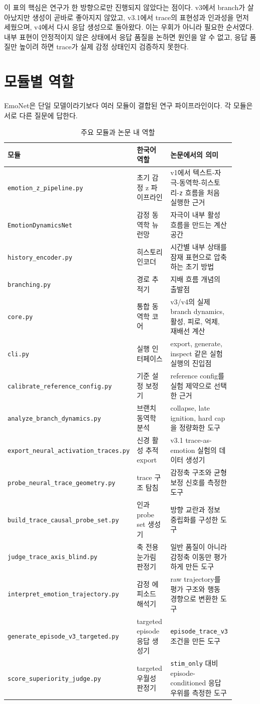 \documentclass[11pt,a4paper]{article}
\newcommand{\eng}[1]{\texttt{#1}}
\begin{document}
이 표의 핵심은 연구가 한 방향으로만 진행되지 않았다는 점이다. v3에서 branch가 살아났지만 생성이 곧바로 좋아지지 않았고, v3.1에서 trace의 표현성과 인과성을 먼저 세웠으며, v4에서 다시 응답 생성으로 돌아왔다. 이는 우회가 아니라 필요한 순서였다. 내부 표현이 안정적이지 않은 상태에서 응답 품질을 논하면 원인을 알 수 없고, 응답 품질만 높이려 하면 trace가 실제 감정 상태인지 검증하지 못한다.

\section{모듈별 역할}

EmoNet은 단일 모델이라기보다 여러 모듈이 결합된 연구 파이프라인이다. 각 모듈은 서로 다른 질문에 답한다.

\begin{longtable}{p{0.34\linewidth}p{0.25\linewidth}p{0.31\linewidth}}
\caption{주요 모듈과 논문 내 역할}\\
\toprule
모듈 & 한국어 역할 & 논문에서의 의미 \\
\midrule
\eng{emotion\_z\_pipeline.py} & 초기 감정 z 파이프라인 & v1에서 텍스트-자극-동역학-히스토리-\eng{z} 흐름을 처음 실행한 근거 \\
\eng{EmotionDynamicsNet} & 감정 동역학 뉴런망 & 자극이 내부 활성 흐름을 만드는 계산 공간 \\
\eng{history\_encoder.py} & 히스토리 인코더 & 시간별 내부 상태를 잠재 표현으로 압축하는 초기 방법 \\
\eng{branching.py} & 경로 추적기 & 지배 흐름 개념의 출발점 \\
\eng{core.py} & 통합 동역학 코어 & v3/v4의 실제 branch dynamics, 활성, 피로, 억제, 재배선 계산 \\
\eng{cli.py} & 실행 인터페이스 & export, generate, inspect 같은 실험 실행의 진입점 \\
\eng{calibrate\_reference\_config.py} & 기준 설정 보정기 & reference config를 실험 제약으로 선택한 근거 \\
\eng{analyze\_branch\_dynamics.py} & 브랜치 동역학 분석 & collapse, late ignition, hard cap을 정량화한 도구 \\
\eng{export\_neural\_activation\_traces.py} & 신경 활성 추적 export & v3.1 trace-as-emotion 실험의 데이터 생성기 \\
\eng{probe\_neural\_trace\_geometry.py} & trace 구조 탐침 & 감정축 구조와 균형 보정 신호를 측정한 도구 \\
\eng{build\_trace\_causal\_probe\_set.py} & 인과 probe set 생성기 & 방향 교란과 정보 중립화를 구성한 도구 \\
\eng{judge\_trace\_axis\_blind.py} & 축 전용 눈가림 판정기 & 일반 품질이 아니라 감정축 이동만 평가하게 만든 도구 \\
\eng{interpret\_emotion\_trajectory.py} & 감정 에피소드 해석기 & raw trajectory를 평가 구조와 행동 경향으로 변환한 도구 \\
\eng{generate\_episode\_v3\_targeted.py} & targeted episode 응답 생성기 & \eng{episode\_trace\_v3} 조건을 만든 도구 \\
\eng{score\_superiority\_judge.py} & targeted 우월성 판정기 & \eng{stim\_only} 대비 episode-conditioned 응답 우위를 측정한 도구 \\
\bottomrule
\end{longtable}
\end{document}

